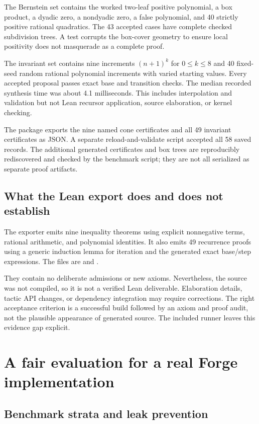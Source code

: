The Bernstein set contains the worked two-leaf positive polynomial, a box
product, a dyadic zero, a nondyadic zero, a false polynomial, and 40 strictly
positive rational quadratics. The 43 accepted cases have complete checked
subdivision trees. A test corrupts the box-cover geometry to ensure local
positivity does not masquerade as a complete proof.

The invariant set contains nine increments $(n+1)^k$ for $0\leq k\leq8$ and
40 fixed-seed random rational polynomial increments with varied starting
values. Every accepted proposal passes exact base and transition checks.
The median recorded synthesis time was about 4.1 milliseconds. This includes
interpolation and validation but not Lean recursor application, source
elaboration, or kernel checking.

The package exports the nine named cone certificates and all 49 invariant
certificates as JSON. A separate reload-and-validate script accepted all 58
saved records. The additional generated certificates and box trees are
reproducibly rediscovered and checked by the benchmark script; they are not
all serialized as separate proof artifacts.

\subsection{What the Lean export does and does not establish}

The exporter emits nine inequality theorems using explicit nonnegative terms,
rational arithmetic, and polynomial identities. It also emits 49 recurrence
proofs using a generic induction lemma for iteration and the generated exact
base/step expressions. The files are  and
.

They contain no deliberate admissions or new axioms. Nevertheless, the source
was not compiled, so it is not a verified Lean deliverable. Elaboration details,
tactic API changes, or dependency integration may require corrections. The
right acceptance criterion is a successful build followed by an axiom and
proof audit, not the plausible appearance of generated source. The included
runner leaves this evidence gap explicit.

\section{A fair evaluation for a real Forge implementation}

\subsection{Benchmark strata and leak prevention}

